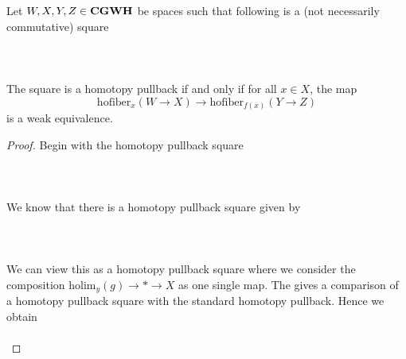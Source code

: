 \documentclass[a4paper]{article}
\begin{document}
\begin{prp}{}{} Let $W,X,Y,Z\in\bold{CGWH}$ be spaces such that following is a (not necessarily commutative) square \\~\\
\\~\\
The square is a homotopy pullback if and only if for all $x\in X$, the map $$\text{hofiber}_x(W\to X)\to\text{hofiber}_{f(x)}(Y\to Z)$$ is a weak equivalence. \tcbline
\begin{proof}
Begin with the homotopy pullback square \\~\\
\\~\\
We know that there is a homotopy pullback square given by \\~\\
\\~\\
We can view this as a homotopy pullback square where we consider the composition $\text{holim}_y(g)\to\ast\to X$ as one single map. The gives a comparison of a homotopy pullback square with the standard homotopy pullback. Hence we obtain \\~\\
\end{proof}
\end{prp}
\end{document}
